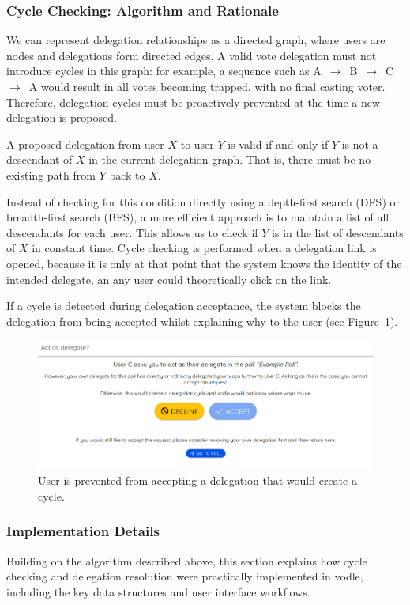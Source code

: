 \subsubsection*{Cycle Checking: Algorithm and Rationale}
We can represent delegation relationships as a directed graph, where users are nodes and delegations form directed edges. A valid vote delegation must not introduce cycles in this graph: for example, a sequence such as A~$\rightarrow$~B~$\rightarrow$~C~$\rightarrow$~A would result in all votes becoming trapped, with no final casting voter. Therefore, delegation cycles must be proactively prevented at the time a new delegation is proposed.

A proposed delegation from user $X$ to user $Y$ is valid if and only if $Y$ is not a descendant of $X$ in the current delegation graph. That is, there must be no existing path from $Y$ back to $X$.

Instead of checking for this condition directly using a depth-first search (DFS) or breadth-first search (BFS), a more efficient approach is to maintain a list of all descendants for each user. This allows us to check if $Y$ is in the list of descendants of $X$ in constant time. Cycle checking is performed when a delegation link is opened, because it is only at that point that the system knows the identity of the intended delegate, an any user could theoretically click on the link.

If a cycle is detected during delegation acceptance, the system blocks the delegation from being accepted whilst explaining why to the user (see Figure~\ref{fig:del-accept-cycle}).

\begin{figure}[H]
  \centering
  \includegraphics[width=\linewidth]{../common/initial_vodle_screenshots/delaccept_cycle.png}
  \caption{User is prevented from accepting a delegation that would create a cycle.}\label{fig:del-accept-cycle}
\end{figure}

\subsubsection{Implementation Details}
Building on the algorithm described above, this section explains how cycle checking and delegation resolution were practically implemented in vodle, including the key data structures and user interface workflows.

